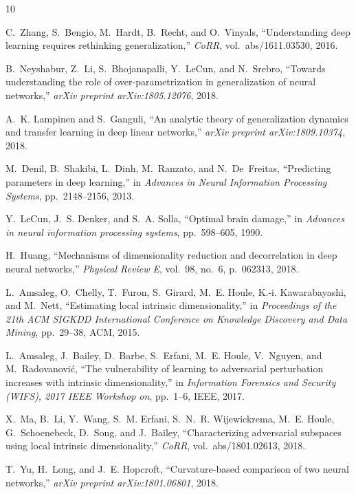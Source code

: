 \documentclass{article}
\begin{document}
\begin{thebibliography}{10}

C.~Zhang, S.~Bengio, M.~Hardt, B.~Recht, and O.~Vinyals, ``Understanding deep
  learning requires rethinking generalization,'' {\em CoRR},
  vol.~abs/1611.03530, 2016.

B.~Neyshabur, Z.~Li, S.~Bhojanapalli, Y.~LeCun, and N.~Srebro, ``Towards
  understanding the role of over-parametrization in generalization of neural
  networks,'' {\em arXiv preprint arXiv:1805.12076}, 2018.

A.~K. Lampinen and S.~Ganguli, ``An analytic theory of generalization dynamics
  and transfer learning in deep linear networks,'' {\em arXiv preprint
  arXiv:1809.10374}, 2018.

M.~Denil, B.~Shakibi, L.~Dinh, M.~Ranzato, and N.~De~Freitas, ``Predicting
  parameters in deep learning,'' in {\em Advances in Neural Information
  Processing Systems}, pp.~2148--2156, 2013.

Y.~LeCun, J.~S. Denker, and S.~A. Solla, ``Optimal brain damage,'' in {\em
  Advances in neural information processing systems}, pp.~598--605, 1990.

H.~Huang, ``Mechanisms of dimensionality reduction and decorrelation in deep
  neural networks,'' {\em Physical Review E}, vol.~98, no.~6, p.~062313, 2018.

L.~Amsaleg, O.~Chelly, T.~Furon, S.~Girard, M.~E. Houle, K.-i. Kawarabayashi,
  and M.~Nett, ``Estimating local intrinsic dimensionality,'' in {\em
  Proceedings of the 21th ACM SIGKDD International Conference on Knowledge
  Discovery and Data Mining}, pp.~29--38, ACM, 2015.

L.~Amsaleg, J.~Bailey, D.~Barbe, S.~Erfani, M.~E. Houle, V.~Nguyen, and
  M.~Radovanovi{\'c}, ``The vulnerability of learning to adversarial
  perturbation increases with intrinsic dimensionality,'' in {\em Information
  Forensics and Security (WIFS), 2017 IEEE Workshop on}, pp.~1--6, IEEE, 2017.

X.~Ma, B.~Li, Y.~Wang, S.~M. Erfani, S.~N.~R. Wijewickrema, M.~E. Houle,
  G.~Schoenebeck, D.~Song, and J.~Bailey, ``Characterizing adversarial
  subspaces using local intrinsic dimensionality,'' {\em CoRR},
  vol.~abs/1801.02613, 2018.

T.~Yu, H.~Long, and J.~E. Hopcroft, ``Curvature-based comparison of two neural
  networks,'' {\em arXiv preprint arXiv:1801.06801}, 2018.


\end{thebibliography}
\end{document}
